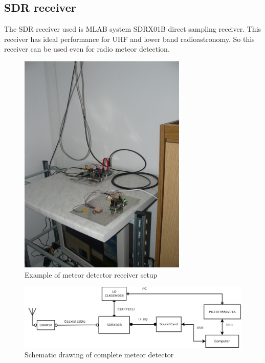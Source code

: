 \documentclass[12pt,a4paper,oneside]{article}
\begin{document}
\subsection{SDR receiver}

The SDR receiver used is MLAB system SDRX01B direct sampling receiver. This receiver has ideal performance for UHF and lower band radioastronomy.    So this receiver can be used even for radio meteor detection. 

\begin{figure} [htbp]
\begin{center}
\includegraphics [width=80mm] {./img/meteor-detector_receiver.JPG} 
\end{center}
\caption{Example of meteor detector receiver setup}
\end{figure}


\begin{figure} [htbp]
\begin{center}
\includegraphics [width=150mm] {./img/RMDS01A_system.png} 
\end{center}
\caption{Schematic drawing of complete meteor detector}
\end{figure}
\end{document}
